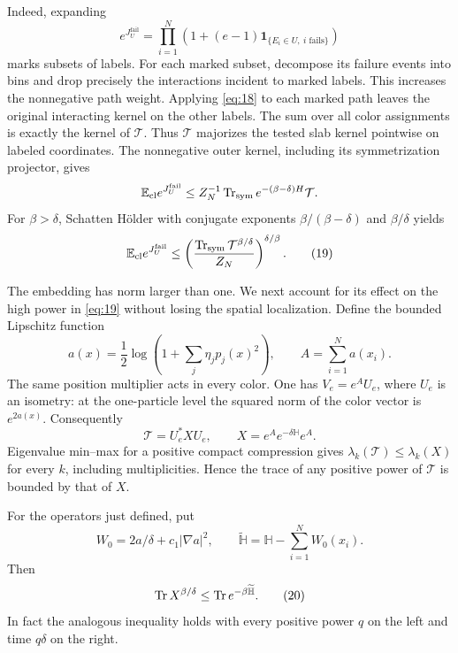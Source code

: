 Indeed, expanding
\[
 e^{J_U^{\mathrm{fail}}}
 =\prod_{i=1}^N\left(1+(e-1)
        \mathbf1_{\{E_i\in U,\ i\text{ fails}\}}\right)
\]
marks subsets of labels.  For each marked subset, decompose its
failure events into bins and drop precisely the interactions
incident to marked labels.  This increases the nonnegative path
weight.  Applying \eqref{eq:18} to each marked path leaves the
original interacting kernel on the other labels.  The sum over
all color assignments is exactly the kernel of $\mathcal T$.
Thus $\mathcal T$ majorizes the tested slab kernel pointwise on
labeled coordinates.  The nonnegative outer kernel, including
its symmetrization projector, gives
\[
 \mathbb E_{\mathrm{cl}}e^{J_U^{\mathrm{fail}}}
 \le Z_N^{-1}\operatorname{Tr}_{\mathrm{sym}}
                     e^{-(\beta-\delta)H}\mathcal T.
\]
For $\beta>\delta$, Schatten H\"older with conjugate exponents
$\beta/(\beta-\delta)$ and $\beta/\delta$ yields
\begin{equation}
 \mathbb E_{\mathrm{cl}}e^{J_U^{\mathrm{fail}}}
 \le
 \left(\frac{\operatorname{Tr}_{\mathrm{sym}}\mathcal T^{\beta/\delta}}
                   {Z_N}\right)^{\delta/\beta}.
 \tag{19}\label{eq:19}
\end{equation}

The embedding has norm larger than one.  We next account for its
effect on the high power in \eqref{eq:19} without losing the spatial
localization.  Define the bounded Lipschitz function
\[
 a(x)=\frac12\log\left(1+\sum_j\eta_jp_j(x)^2\right),
 \qquad A=\sum_{i=1}^N a(x_i).
\]
The same position multiplier acts in every color.  One has
$V_e=e^A U_e$, where $U_e$ is an isometry: at the one-particle
level the squared norm of the color vector is $e^{2a(x)}$.
Consequently
\[
 \mathcal T=U_e^*XU_e,\qquad
 X=e^Ae^{-\delta\mathbb H}e^A.
\]
Eigenvalue min--max for a positive compact compression gives
$\lambda_k(\mathcal T)\le\lambda_k(X)$ for every $k$, including
multiplicities.  Hence the trace of any positive power of
$\mathcal T$ is bounded by that of $X$.

\begin{lemma}
\label{lem:operator-sandwich}
For the operators just defined, put
\[
 W_0=2a/\delta+c_1|\nabla a|^2,
 \qquad
 \widetilde{\mathbb H}=\mathbb H-\sum_{i=1}^N W_0(x_i).
\]
Then
\begin{equation}
 \operatorname{Tr} X^{\beta/\delta}
       \le\operatorname{Tr} e^{-\beta\widetilde{\mathbb H}}.
 \tag{20}\label{eq:20}
\end{equation}
In fact the analogous inequality holds with every positive power
$q$ on the left and time $q\delta$ on the right.
\end{lemma}

